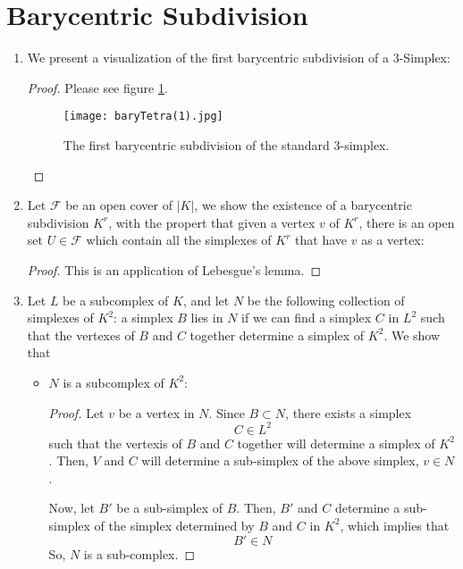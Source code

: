 \documentclass{book}
\begin{document}
\section{Barycentric Subdivision}
\begin{enumerate}[(1)]
    \item We present a visualization of the first barycentric subdivision of a $3$-Simplex: 
        \begin{proof} Please see figure \hyperref[fig:baryTetra]{\ref{fig:baryTetra}}. 
            \begin{figure}[p]
                \centering
                \texttt{[image: baryTetra(1).jpg]}
                \caption{The first barycentric subdivision of the standard $3$-simplex.}
                \label{fig:baryTetra}
            \end{figure}
        \end{proof}

    \item Let $\mathcal{F}$ be an open cover of $|K|$, we show the existence of a barycentric subdivision $K^r$, with the propert that given a vertex $v$ of $K^r$, there is an open set $U \in \mathcal{F}$ which contain all the simplexes of $K^r$ that have $v$ as a vertex: 
        \begin{proof} This is an application of Lebesgue's lemma. 
        \end{proof}

    \item Let $L$ be a subcomplex of $K$, and let $N$ be the following collection of simplexes of $K^2$: a simplex $B$ lies in $N$ if we can find a simplex $C$ in $L^2$ such that the vertexes of $B$ and $C$ together determine a simplex of $K^2$. We show that
        \begin{itemize}
            \item $N$ is a subcomplex of $K^2$: 
                \begin{proof} Let $v$ be a vertex in $N$. Since $B \subset N$, there exists a simplex 
                    \[C \in L^2\]
                    such that the vertexis of $B$ and $C$ together will determine a simplex of $K^2$. Then, $V$ and $C$ will determine a sub-simplex of the above simplex, $v \in N$. 
                    \par Now, let $B'$ be  a sub-simplex of $B$. Then, $B'$ and $C$ determine a sub-simplex of the simplex determined by $B$ and $C$ in $K^2$, which implies that 
                    \[B' \in N\]
                    So, $N$ is a sub-complex. 
                \end{proof}


\end{itemize}
\end{enumerate}
\end{document}
